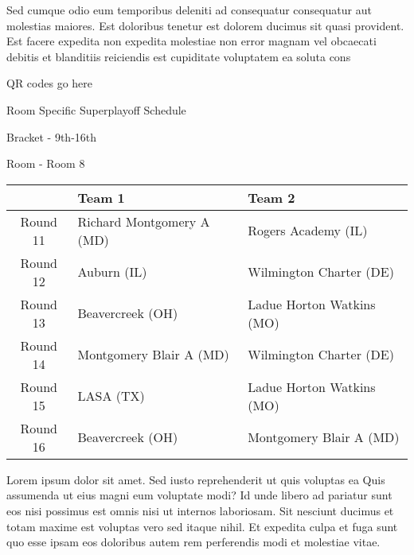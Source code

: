 \documentclass{article}%
\begin{document}
\newline%
    Sed cumque odio eum temporibus deleniti ad consequatur consequatur aut molestias maiores. Est doloribus tenetur est dolorem ducimus sit quasi provident. Est facere expedita non expedita molestiae non error magnam vel obcaecati debitis et blanditiis reiciendis est cupiditate voluptatem ea soluta cons%
\vspace*{140pt}%
\begin{center}%
\begin{Huge}%
QR codes go here%
\end{Huge}%
\end{center}%
\newpage%
\begin{center}%
\begin{Huge}%
Room Specific Superplayoff Schedule%
\end{Huge}%
\vspace*{8pt}%
\linebreak%
\begin{Large}%
Bracket {-} 9th{-}16th%
\end{Large}%
\vspace*{8pt}%
\linebreak%
\vspace*{8pt}%
\begin{Large}%
Room {-} Room 8%
\end{Large}%
\end{center}%
%
\begin{tabularx}{\textwidth}{|c|Y|Y|}%
\hline%
&Team 1&Team 2\\%
\hline%
Round 11&Richard Montgomery A (MD)&Rogers Academy (IL)\\%
Round 12&Auburn (IL)&Wilmington Charter (DE)\\%
Round 13&Beavercreek (OH)&Ladue Horton Watkins (MO)\\%
Round 14&Montgomery Blair A (MD)&Wilmington Charter (DE)\\%
Round 15&LASA (TX)&Ladue Horton Watkins (MO)\\%
Round 16&Beavercreek (OH)&Montgomery Blair A (MD)\\%
\hline%
\end{tabularx}%
\vspace*{8pt}%
\newline%
    Lorem ipsum dolor sit amet. Sed iusto reprehenderit ut quis voluptas ea Quis assumenda ut eius magni eum voluptate modi? Id unde libero ad pariatur sunt eos nisi possimus est omnis nisi ut internos laboriosam. Sit nesciunt ducimus et totam maxime est voluptas vero sed itaque nihil. Et expedita culpa et fuga sunt quo esse ipsam eos doloribus autem rem perferendis modi et molestiae vitae.\newline%
\end{document}
